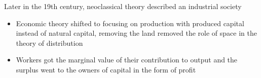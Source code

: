 \documentclass[]{beamer} %
\begin{document}
\begin{frame}{Later in the 19th century, neoclassical theory described  an industrial society}
\begin{itemize}
\item Economic theory shifted to focusing on production with produced capital instead of natural capital, removing the land removed the role of space in the theory of distribution


\item Workers got the marginal value of their contribution to output and the surplus went to the owners of capital in the form of profit 

\end{itemize}
\end{frame}
\end{document}
